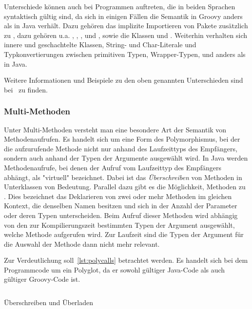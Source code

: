 \documentclass[11pt,a4paper]{article}
\begin{document}
	Unterschiede können auch bei Programmen auftreten, die in beiden Sprachen syntaktisch gültig sind, da sich in einigen Fällen die Semantik in Groovy anders als in Java verhält.
	Dazu gehören das implizite Importieren von Pakete zusätzlich zu , dazu gehören {u.a.} , , ,  und , sowie die Klassen  und .
	Weiterhin verhalten sich innere und geschachtelte Klassen, String- und Char-Literale und Typkonvertierungen zwischen primitiven Typen, Wrapper-Typen,  und  anders als in Java.

	Weitere Informationen und Beispiele zu den oben genannten Unterschieden sind bei~\cite{groovy-lang:differences} zu finden.

	\subsubsection{Multi-Methoden}

	Unter Multi-Methoden versteht man eine besondere Art der Semantik von Methodenaufrufen.
	Es handelt sich um eine Form des Polymorphismus, bei der die aufzurufende Methode nicht nur anhand des Laufzeittyps des Empfängers, sondern auch anhand der Typen der Argumente ausgewählt wird.
	In Java werden Methodenaufrufe, bei denen der Aufruf vom Laufzeittyp des Empfängers abhängt, als "virtuell" bezeichnet.
	Dabei ist das \emph{Überschreiben} von Methoden in Unterklassen von Bedeutung.
	Parallel dazu gibt es die Möglichkeit, Methoden zu .
	Dies bezeichnet das Deklarieren von zwei oder mehr Methoden im gleichen Kontext, die denselben Namen besitzen und sich in der Anzahl der Parameter oder deren Typen unterscheiden.
	Beim Aufruf dieser Methoden wird abhängig von den zur Kompilierungszeit bestimmten Typen der Argument ausgewählt, welche Methode aufgerufen wird.
	Zur Laufzeit sind die Typen der Argument für die Auswahl der Methode dann nicht mehr relevant.

	Zur Verdeutlichung soll~\ref{lst:polycalls} betrachtet werden.
	Es handelt sich bei dem Programmcode um ein Polyglot,
	da er sowohl gültiger Java-Code als auch gültiger Groovy-Code ist.


	\begin{listing}[ht]
		\inputminted{java}{java/PolyCalls.java}
		\caption{Überschreiben und Überladen}
		\label{lst:polycalls}
	\end{listing}
\end{document}
